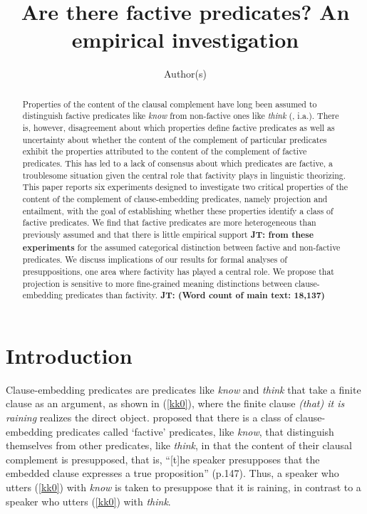 \documentclass[11pt,fleqn]{article}
\title{Are there factive predicates? An empirical investigation}
\author{Author(s)}
\newcommand{\6}{\mbox{$[\hspace*{-.6mm}[$}}
\newcommand{\9}{\mbox{$]\hspace*{-.6mm}]$}}
\newcommand{\jt}[1]{\textbf{\color{blue}JT: #1}}
\begin{document}

\maketitle

\vspace*{-1cm}

\begin{abstract}

Properties of the content of the clausal complement have long been assumed to distinguish factive predicates like {\em know} from non-factive ones like {\em think} (\citealt{kiparsky-kiparsky70}, i.a.). There is, however, disagreement about which properties define factive predicates as well as uncertainty about whether the content of the complement of particular predicates exhibit the properties attributed to the content of the complement of factive predicates. This has led to a lack of consensus about which predicates are factive, a troublesome situation given the central role that factivity plays in linguistic theorizing. This paper reports six experiments designed to investigate two critical properties of the content of the complement of clause-embedding predicates, namely projection and entailment, with the goal of establishing whether these properties identify a class of factive predicates. We find that factive predicates are more heterogeneous than previously assumed and that there is little empirical support \jt{from these experiments} for the assumed categorical distinction between factive and non-factive predicates. We discuss implications of our results for formal analyses of presuppositions, one area where factivity has played a central role. We propose that projection is sensitive to more fine-grained meaning distinctions between clause-embedding predicates than factivity. \jt{(Word count of main text: 18,137)}

\end{abstract}

		
\section{Introduction}\label{s1}

Clause-embedding predicates are predicates like {\em know} and {\em think} that take a finite clause as an argument, as shown in (\ref{kk0}), where the finite clause {\em (that) it is raining} realizes the direct object. \citealt{kiparsky-kiparsky70} proposed that there is a  class of clause-embedding predicates called `factive' predicates, like {\em know}, that distinguish themselves from other predicates, like {\em think}, in that the content of their clausal complement is presupposed, that is, ``[t]he speaker presupposes that the embedded clause expresses a true proposition'' (p.147). Thus, a speaker who utters (\ref{kk0}) with {\em know} is taken to presuppose that it is raining, in contrast to a speaker who utters (\ref{kk0}) with {\em think}.
\end{document}
